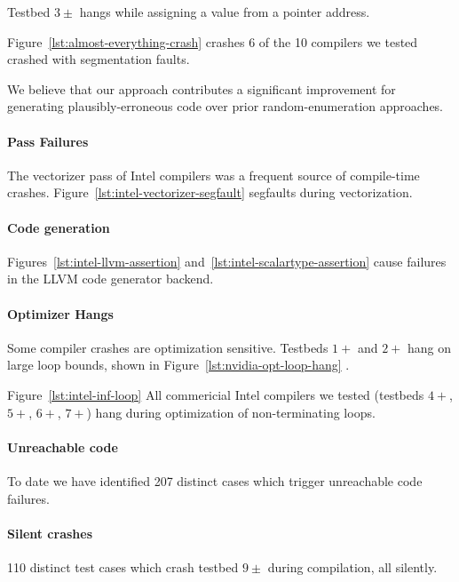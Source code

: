 Testbed $3\pm$ hangs while assigning a value from a pointer address.

Figure~\ref{lst:almost-everything-crash} crashes 6 of the 10 compilers we tested crashed with segmentation faults.

We believe that our approach contributes a significant improvement for generating plausibly-erroneous code over prior random-enumeration approaches.


\paragraph{Pass Failures} The vectorizer pass of Intel compilers was a frequent source of compile-time crashes. Figure~\ref{lst:intel-vectorizer-segfault} segfaults during vectorization.


\paragraph{Code generation} Figures~\ref{lst:intel-llvm-assertion} and~\ref{lst:intel-scalartype-assertion} cause failures in the LLVM code generator backend.


\paragraph{Optimizer Hangs} Some compiler crashes are optimization sensitive. Testbeds $1+$ and $2+$ hang on large loop bounds, shown in Figure~\ref{lst:nvidia-opt-loop-hang} .

Figure~\ref{lst:intel-inf-loop} All commericial Intel compilers we tested (testbeds $4+$, $5+$, $6+$, $7+$) hang during optimization of non-terminating loops.


\paragraph{Unreachable code} To date we have identified 207 distinct cases which trigger unreachable code failures. 


\paragraph{Silent crashes} 110 distinct test cases which crash testbed $9\pm$ during compilation, all silently.


